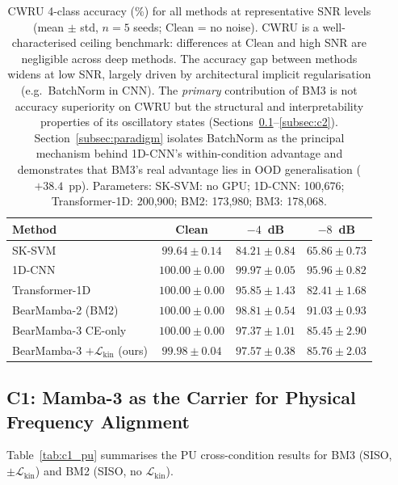 \begin{table}[htbp]
\centering
\caption{CWRU 4-class accuracy (\%) for all methods at representative SNR levels
         (mean $\pm$ std, $n=5$ seeds; Clean = no noise).
         CWRU is a well-characterised ceiling benchmark: differences at
         Clean and high SNR are negligible across deep methods.
         The accuracy gap between methods widens at low SNR, largely driven
         by architectural implicit regularisation (e.g.\ BatchNorm in CNN).
         The \emph{primary} contribution of BM3 is not accuracy superiority
         on CWRU but the structural and interpretability properties of its
         oscillatory states (Sections~\ref{subsec:c1}--\ref{subsec:c2}).
         Section~\ref{subsec:paradigm} isolates BatchNorm as the principal
         mechanism behind 1D-CNN's within-condition advantage and demonstrates
         that BM3's real advantage lies in OOD generalisation ($+38.4$~pp).
         Parameters: SK-SVM: no GPU; 1D-CNN: 100,676; Transformer-1D: 200,900;
         BM2: 173,980; BM3: 178,068.}
\label{tab:cwru_baselines}
\begin{tabular}{lccc}
\toprule
Method & Clean & $-4$~dB & $-8$~dB \\
\midrule
SK-SVM          & $99.64 \pm 0.14$ & $84.21 \pm 0.84$ & $65.86 \pm 0.73$ \\
1D-CNN          & $100.00 \pm 0.00$ & $99.97 \pm 0.05$ & $95.96 \pm 0.82$ \\
Transformer-1D  & $100.00 \pm 0.00$ & $95.85 \pm 1.43$ & $82.41 \pm 1.68$ \\
\midrule
BearMamba-2 (BM2)        & $100.00 \pm 0.00$ & $98.81 \pm 0.54$ & $91.03 \pm 0.93$ \\
BearMamba-3 CE-only      & $100.00 \pm 0.00$ & $97.37 \pm 1.01$ & $85.45 \pm 2.90$ \\
BearMamba-3 $+\mathcal{L}_{\text{kin}}$ (ours) & $99.98 \pm 0.04$ & $97.57 \pm 0.38$ & $85.76 \pm 2.03$ \\
\bottomrule
\end{tabular}
\end{table}


\subsection{C1: Mamba-3 as the Carrier for Physical Frequency Alignment}
\label{subsec:c1}

Table~\ref{tab:c1_pu} summarises the PU cross-condition results for BM3
(SISO, $\pm\mathcal{L}_{\text{kin}}$) and BM2 (SISO, no $\mathcal{L}_{\text{kin}}$).

